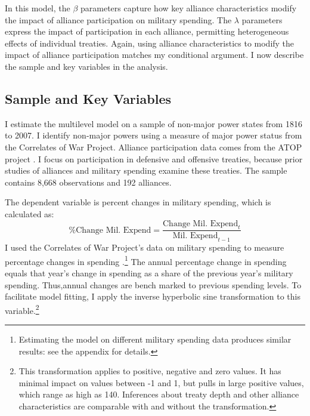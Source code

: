 \documentclass[12pt]{article}
\begin{document}
In this model, the $\beta$ parameters capture how key alliance characteristics modify the impact of alliance participation on military spending. 
The $\lambda$ parameters express the impact of participation in each alliance, permitting heterogeneous effects of individual treaties. 
Again, using alliance characteristics to modify the impact of alliance participation matches my conditional argument. 
I now describe the sample and key variables in the analysis.  



\subsection*{Sample and Key Variables} 

I estimate the multilevel model on a sample of non-major power states from 1816 to 2007. 
I identify non-major powers using a measure of major power status from the Correlates of War Project. 
Alliance participation data comes from the ATOP project \citep{Leedsetal2002}.  
I focus on participation in defensive and offensive treaties, because prior studies of alliances and military spending examine these treaties. 
The sample contains 8,668 observations and 192 alliances. 


The dependent variable is percent changes in military spending, which is calculated as:
\begin{equation}
\mbox{\% Change Mil. Expend} = \frac{ \mbox{Change Mil. Expend}_t }{ \mbox{Mil. Expend}_{t-1} }
\end{equation} 
I used the Correlates of War Project's data on military spending to measure percentage changes in spending \citep{SingerCINC1988}.\footnote{Estimating the model on different military spending data produces similar results: see the appendix for details.} 
The annual percentage change in spending equals that year's change in spending as a share of the previous year's military spending.
Thus,annual changes are bench marked to previous spending levels. 
To facilitate model fitting, I apply the inverse hyperbolic sine transformation to this variable.\footnote{This transformation applies to positive, negative and zero values. It has minimal impact on values between -1 and 1, but pulls in large positive values, which range as high as 140. Inferences about treaty depth and other alliance characteristics are comparable with and without the transformation.}
\end{document}
